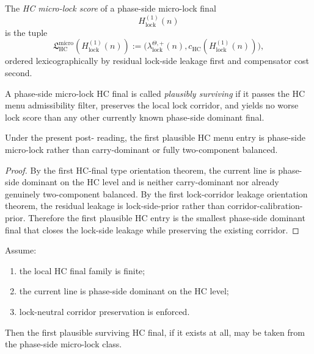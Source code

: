 \begin{definition}
\label{def:hc-micro-lock-score}
The \emph{HC micro-lock score} of a phase-side micro-lock final
\[
 H_{\mathrm{lock}}^{(1)}(n)
\]
is the tuple
\[
 \mathfrak L_{\mathrm{HC}}^{\mathrm{micro}}(H_{\mathrm{lock}}^{(1)}(n))
 :=
 \bigl(
 \lambda_{\mathrm{lock}}^{\Theta,+}(n),
 c_{\mathrm{HC}}(H_{\mathrm{lock}}^{(1)}(n))
 \bigr),
\]
ordered lexicographically by residual lock-side leakage first and compensator cost second.
\end{definition}

\begin{definition}
\label{def:plausible-surviving-hc-final}
A phase-side micro-lock HC final is called \emph{plausibly surviving} if it passes the HC menu admissibility filter, preserves the local lock corridor, and yields no worse lock score than any other currently known phase-side dominant final.
\end{definition}

\begin{proposition}
\label{prop:current-line-favors-a-phase-side-micro-lock-final}
Under the present post- reading, the first plausible HC menu entry is phase-side micro-lock rather than carry-dominant or fully two-component balanced.
\end{proposition}

\begin{proof}
By the first HC-final type orientation theorem, the current line is phase-side dominant on the HC level and is neither carry-dominant nor already genuinely two-component balanced. By the first lock-corridor leakage orientation theorem, the residual leakage is lock-side-prior rather than corridor-calibration-prior. Therefore the first plausible HC entry is the smallest phase-side dominant final that closes the lock-side leakage while preserving the existing corridor.
\end{proof}

\begin{lemma}
\label{lem:plausible-survival-of-the-phase-side-micro-lock-final}
Assume:
\begin{enumerate}[leftmargin=2em,label=(\alph*)]
 \item the local HC final family is finite;
 \item the current line is phase-side dominant on the HC level;
 \item lock-neutral corridor preservation is enforced.
\end{enumerate}
Then the first plausible surviving HC final, if it exists at all, may be taken from the phase-side micro-lock class.
\end{lemma}

